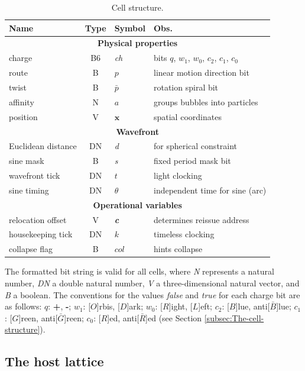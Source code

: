 \documentclass[12pt,english]{article}
\begin{document}
\begin{table}
\begin{centering}
\begin{tabular}{|l|c|l|l|}
\hline 
\textbf{\large{}Name} & \textbf{\large{}Type} & \textbf{\large{}Symbol} & \textbf{\large{}Obs.}\tabularnewline
\hline 
\hline 
\multicolumn{4}{|c|}{\textbf{Physical properties}}\tabularnewline
\hline 
charge & B6 & \emph{ch} & bits $q$, $w_{1}$, $w_{0}$, $c_{2}$, $c_{1}$, $c_{0}$\tabularnewline
\hline 
route & B & $p$ & linear motion direction bit\tabularnewline
\hline 
twist & B & $\bar{p}$ & rotation spiral bit\tabularnewline
\hline 
affinity & N & $a$ & groups bubbles into particles\tabularnewline
\hline 
position & V & $\boldsymbol{x}$ & spatial coordinates\tabularnewline
\hline 
\multicolumn{4}{|c|}{\textbf{Wavefront}}\tabularnewline
\hline 
Euclidean distance & DN & \emph{d} & for spherical constraint\tabularnewline
\hline 
sine mask & B & \emph{s} & fixed period mask bit\tabularnewline
\hline 
wavefront tick & DN & $t$ & light clocking\tabularnewline
\hline 
sine timing & DN & $\theta$ & independent time for sine (arc)\tabularnewline
\hline 
\multicolumn{4}{|c|}{\textbf{Operational variables}}\tabularnewline
\hline 
relocation offset & V & \textbf{\emph{c}} & determines reissue address\tabularnewline
\hline 
housekeeping tick & DN & $k$ & timeless clocking\tabularnewline
\hline 
collapse flag & B & $col$ & hints collapse\tabularnewline
\hline 
\end{tabular}
\par\end{centering}

\caption{Cell structure.}

{\small{}The formatted bit string is valid for all cells, where }\emph{\small{}N}{\small{}
represents a natural number, }\emph{\small{}DN}{\small{} 
a double natural number, }\emph{\small{}V}{\small{} a three-dimensional natural vector, and }\emph{\small{}B}{\small{} 
a boolean. The conventions for the values }\emph{\small{}false}{\small{} and }\emph{\small{}true}{\small{} for each 
charge bit are as follows: $q$: }\textbf{\small{}+}{\small{}, }\textbf{\small{}-}{\small{}; $w_{1}$: {[}$O${]}rbis, {[}$D${]}ark; 
$w_{0}$: {[}$R${]}ight, {[}$L${]}eft; $c_{2}$: {[}$B${]}lue, anti{[}$\bar{B}${]}lue; $c_{1}$: {[}$G${]}reen, anti{[}$\bar{G}${]}reen; 
$c_{0}$: {[}$R${]}ed, anti{[}$\bar{R}${]}ed (see Section \ref{subsec:The-cell-structure}).}\label{tab:Cell-structure}
\end{table}

\subsection{The host lattice\label{subsec:The-host-lattice}}
\end{document}
